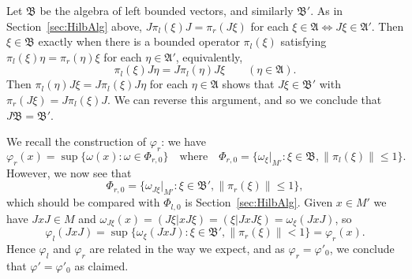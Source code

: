 \documentclass[a4paper,11pt]{article}
\theoremstyle{plain}
\theoremstyle{remark}
\newcommand{\mf}[1]{\mathfrak{#1}}
\begin{document}
Let $\mf B$ be the algebra of left bounded vectors, and similarly $\mf B'$.  As in Section~\ref{sec:HilbAlg} above, $J \pi_l(\xi) J = \pi_r(J\xi)$ for each $\xi\in\mf A \Leftrightarrow J\xi\in\mf A'$.  Then $\xi\in\mf B$ exactly when there is a bounded operator $\pi_l(\xi)$ satisfying $\pi_l(\xi)\eta = \pi_r(\eta)\xi$ for each $\eta\in\mf A'$, equivalently,
\[ \pi_l(\xi)J\eta = J\pi_l(\eta)J\xi \qquad (\eta\in\mf A). \]
Then $\pi_l(\eta) J\xi = J\pi_l(\xi)J\eta$ for each $\eta\in\mf A$ shows that $J\xi\in\mf B'$ with $\pi_r(J\xi) = J\pi_l(\xi)J$.  We can reverse this argument, and so we conclude that $J\mf B = \mf B'$.

We recall the construction of $\varphi_r$: we have
\[ \varphi_r(x) = \sup\{ \omega(x): \omega\in \Phi_{r,0} \}
\quad\text{where}\quad
\Phi_{r,0} = \{ \omega_\xi|_{M'} : \xi\in\mf B, \|\pi_l(\xi)\|\leq 1 \}. \]
However, we now see that
\[ \Phi_{r,0} = \{ \omega_{J\xi}|_{M'} : \xi\in\mf B', \|\pi_r(\xi)\|\leq 1 \}, \]
which should be compared with $\Phi_{l,0}$ is Section~\ref{sec:HilbAlg}.
Given $x\in M'$ we have $JxJ\in M$ and $\omega_{J\xi}(x) = (J\xi|xJ\xi) = (\xi|JxJ\xi) = \omega_\xi(JxJ)$, so
\[ \varphi_l(JxJ) = \sup\big\{ \omega_{\xi}(JxJ) : \xi\in \mf B', \|\pi_r(\xi)\|< 1 \big\}
= \varphi_r(x). \]
Hence $\varphi_l$ and $\varphi_r$ are related in the way we expect, and as $\varphi_r = \varphi'_0$, we conclude that $\varphi' = \varphi'_0$ as claimed.








\end{document}

